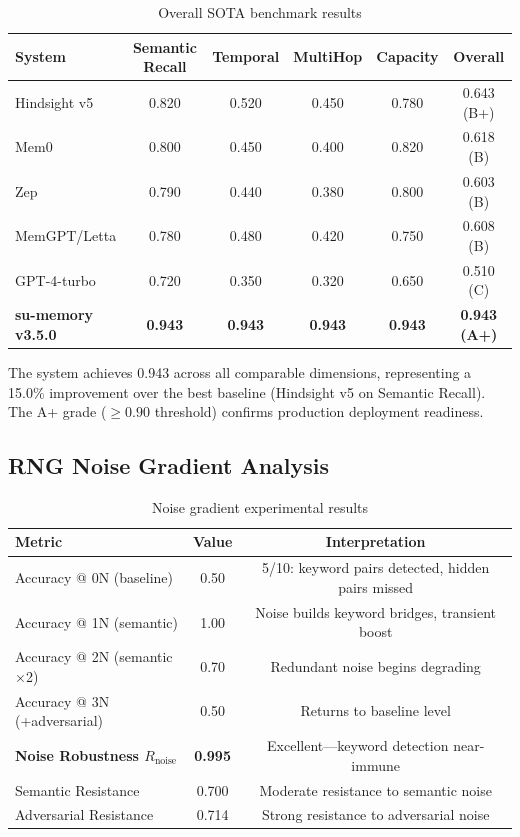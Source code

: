 \documentclass[11pt,a4paper]{article}
\begin{document}
\begin{table}[H]
\centering
\caption{Overall SOTA benchmark results}
\label{tab:sota}
\begin{tabular}{lccccc}
\toprule
\textbf{System} & \textbf{Semantic Recall} & \textbf{Temporal} & \textbf{MultiHop} & \textbf{Capacity} & \textbf{Overall} \\
\midrule
Hindsight v5   & 0.820 & 0.520 & 0.450 & 0.780 & 0.643 (B+) \\
Mem0           & 0.800 & 0.450 & 0.400 & 0.820 & 0.618 (B)  \\
Zep            & 0.790 & 0.440 & 0.380 & 0.800 & 0.603 (B)  \\
MemGPT/Letta   & 0.780 & 0.480 & 0.420 & 0.750 & 0.608 (B)  \\
GPT-4-turbo    & 0.720 & 0.350 & 0.320 & 0.650 & 0.510 (C)  \\
\midrule
\textbf{su-memory v3.5.0} & \textbf{0.943} & \textbf{0.943} & \textbf{0.943} & \textbf{0.943} & \textbf{0.943 (A+)} \\
\bottomrule
\end{tabular}
\end{table}

The system achieves 0.943 across all comparable dimensions, representing a 15.0\% improvement over the best baseline (Hindsight v5 on Semantic Recall). The A+ grade (\(\geq 0.90\) threshold) confirms production deployment readiness.

\subsection{RNG Noise Gradient Analysis}

\begin{table}[H]
\centering
\caption{Noise gradient experimental results}
\label{tab:noise_results}
\begin{tabular}{lcc}
\toprule
\textbf{Metric} & \textbf{Value} & \textbf{Interpretation} \\
\midrule
Accuracy @ 0N (baseline)   & 0.50  & 5/10: keyword pairs detected, hidden pairs missed \\
Accuracy @ 1N (semantic)   & 1.00  & Noise builds keyword bridges, transient boost \\
Accuracy @ 2N (semantic\(\times\)2) & 0.70  & Redundant noise begins degrading \\
Accuracy @ 3N (+adversarial) & 0.50  & Returns to baseline level \\
\midrule
\textbf{Noise Robustness \(R_{\text{noise}}\)} & \textbf{0.995} & Excellent---keyword detection near-immune \\
Semantic Resistance       & 0.700 & Moderate resistance to semantic noise \\
Adversarial Resistance    & 0.714 & Strong resistance to adversarial noise \\
\bottomrule
\end{tabular}
\end{table}
\end{document}
